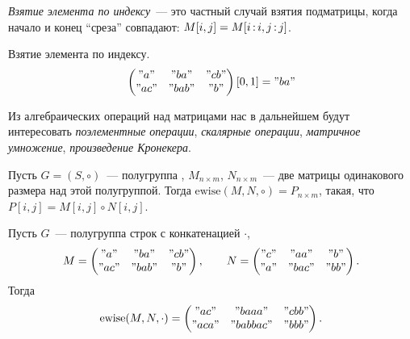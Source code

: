 \begin{definition}
    \emph{Взятие элемента по индексу}~--- это частный случай взятия подматрицы, когда начало и конец \enquote{среза} совпадают: $M[i, j] = M[i \rng i, j \rng j]$.
\end{definition}

\begin{example}
    Взятие элемента по индексу.
    \[
        \begin{pmatrix}
            "a"  & "ba"  & "cb" \\
            "ac" & "bab" & "b"
        \end{pmatrix}[0, 1] = "ba"
    \]
\end{example}

Из алгебраических операций над матрицами нас в дальнейшем будут интересовать \emph{поэлементные операции}, \emph{скалярные операции}, \emph{матричное умножение}, \emph{произведение Кронекера}.

\begin{definition}
    Пусть $G = (S, \circ)$~--- полугруппа%
    , $M_{n \times m}$, $N_{n \times m}$~--- две матрицы одинакового размера над этой полугруппой.
    Тогда $\mathrm{ewise}(M, N, \circ) = P_{n \times m}$, такая, что $P[i, j] = M[i, j] \circ N[i, j]$.
\end{definition}

\begin{example}
    Пусть $G$~--- полугруппа строк с конкатенацией $\cdot$,
    \[M =
        \begin{pmatrix}
            "a"  & "ba"  & "cb" \\
            "ac" & "bab" & "b"
        \end{pmatrix},
        \qquad
        N =
        \begin{pmatrix}
            "c" & "aa"  & "b"  \\
            "a" & "bac" & "bb"
        \end{pmatrix}.
    \]
    Тогда
    \[
        \mathrm{ewise}(M, N, \cdot) =
        \begin{pmatrix}
            "ac"  & "baaa"   & "cbb" \\
            "aca" & "babbac" & "bbb"
        \end{pmatrix}.
    \]
\end{example}

